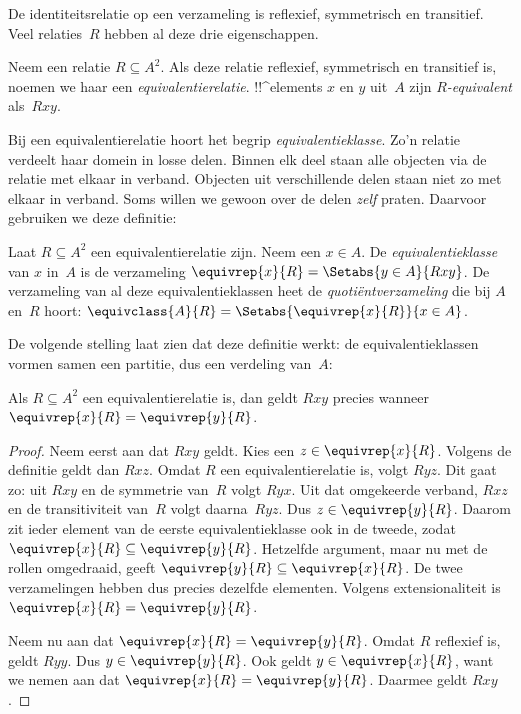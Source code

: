 \documentclass[../../../include/open-logic-section]{subfiles}
\begin{document}


De identiteitsrelatie op een verzameling is reflexief, symmetrisch en
transitief. Veel relaties~$R$ hebben al deze drie eigenschappen.

\begin{defn}[Equivalentierelatie] 
Neem een relatie $R \subseteq A^2$. Als deze relatie reflexief, symmetrisch en
transitief is, noemen we haar een \emph{equivalentierelatie}.
!!^{element}s $x$ en $y$ uit~$A$ zijn \emph{$R$-equivalent} als~$Rxy$.
\end{defn}

Bij een equivalentierelatie hoort het begrip \emph{equivalentieklasse}.
Zo'n relatie verdeelt haar domein in losse delen. Binnen elk deel staan
alle objecten via de relatie met elkaar in verband. Objecten uit
verschillende delen staan niet zo met elkaar in verband. Soms willen
we gewoon over de delen \emph{zelf} praten. Daarvoor gebruiken we deze
definitie:

\begin{defn}
Laat $R \subseteq A^2$ een equivalentierelatie zijn. Neem een $x \in A$.
De \emph{equivalentieklasse} van $x$ in~$A$ is de verzameling
$\equivrep{x}{R} = \Setabs{y \in A}{Rxy}$. De verzameling van al deze
equivalentieklassen heet de \emph{quotiëntverzameling} die bij $A$ en~$R$ hoort:
$\equivclass{A}{R} = \Setabs{\equivrep{x}{R}}{x \in A}$. 
\end{defn}

De volgende stelling laat zien dat deze definitie werkt: de
equivalentieklassen vormen samen een partitie, dus een verdeling van~$A$:

\begin{prop}
Als $R \subseteq A^2$ een equivalentierelatie is, dan geldt $Rxy$ precies wanneer
$\equivrep{x}{R} = \equivrep{y}{R}$.
\end{prop}

\begin{proof}
Neem eerst aan dat $Rxy$ geldt. Kies een $z \in \equivrep{x}{R}$.
Volgens de definitie geldt dan $Rxz$. Omdat $R$ een equivalentierelatie
is, volgt $Ryz$. Dit gaat zo: uit $Rxy$ en de symmetrie van~$R$ volgt
$Ryx$. Uit dat omgekeerde verband, $Rxz$ en de transitiviteit van~$R$
volgt daarna~$Ryz$.
Dus $z \in \equivrep{y}{R}$. Daarom zit ieder element van de eerste
equivalentieklasse ook in de tweede, zodat $\equivrep{x}{R} \subseteq
\equivrep{y}{R}$. Hetzelfde argument, maar nu met de rollen omgedraaid,
geeft $\equivrep{y}{R} \subseteq \equivrep{x}{R}$. De twee verzamelingen
hebben dus precies dezelfde elementen. Volgens extensionaliteit is
$\equivrep{x}{R} = \equivrep{y}{R}$.

Neem nu aan dat $\equivrep{x}{R} = \equivrep{y}{R}$. Omdat $R$
reflexief is, geldt $Ryy$. Dus $y \in \equivrep{y}{R}$. Ook geldt
$y \in \equivrep{x}{R}$, want we nemen aan dat $\equivrep{x}{R} =
\equivrep{y}{R}$. Daarmee geldt $Rxy$.
\end{proof}
\end{document}
